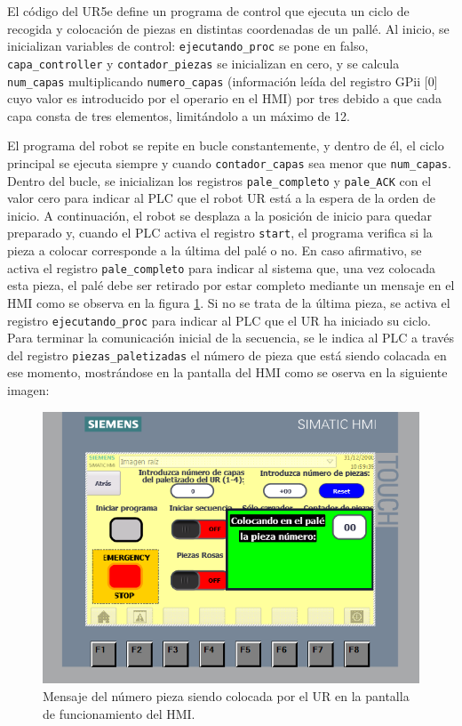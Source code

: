 \FloatBarrier

El código del UR5e define un programa de control que ejecuta un ciclo de recogida y colocación de piezas en distintas coordenadas de un pallé. Al inicio, se inicializan variables de control: \texttt{ejecutando\_proc} se pone en falso, \texttt{capa\_controller} y \texttt{contador\_piezas} se inicializan en cero, y se calcula \texttt{num\_capas} multiplicando \texttt{numero\_capas} (información leída del registro GPii [0] cuyo valor es introducido por el operario en el HMI) por tres debido a que cada capa consta de tres elementos, limitándolo a un máximo de 12.

El programa del robot se repite en bucle constantemente, y dentro de él, el ciclo principal se ejecuta siempre y cuando \texttt{contador\_capas} sea menor que \texttt{num\_capas}. Dentro del bucle, se inicializan los registros \texttt{pale\_completo} y \texttt{pale\_ACK} con el valor cero para indicar al PLC que el robot UR está a la espera de la orden de inicio. A continuación, el robot se desplaza a la posición de inicio para quedar preparado y, cuando el PLC activa el registro \texttt{start}, el programa verifica si la pieza a colocar corresponde a la última del palé o no. En caso afirmativo, se activa el registro \texttt{pale\_completo} para indicar al sistema que, una vez colocada esta pieza, el palé debe ser retirado por estar completo mediante un mensaje en el HMI como se observa en la figura \ref{fig:HMI_funcionamiento_UR}. Si no se trata de la última pieza, se activa el registro \texttt{ejecutando\_proc} para indicar al PLC que el UR ha iniciado su ciclo. Para terminar la comunicación inicial de la secuencia, se le indica al PLC a través del registro \texttt{piezas\_paletizadas} el número de pieza que está siendo colacada en ese momento, mostrándose en la pantalla del HMI como se oserva en la siguiente imagen:

\begin{figure}[h!]
  \begin{center}
  	\includegraphics[width=15cm]{figs/HMI_funcionamiento_UR}
  \end{center}
  \caption{\centering Mensaje del número pieza siendo colocada por el UR en la pantalla de funcionamiento del HMI.}
  \label{fig:HMI_funcionamiento_UR}
\end{figure}

